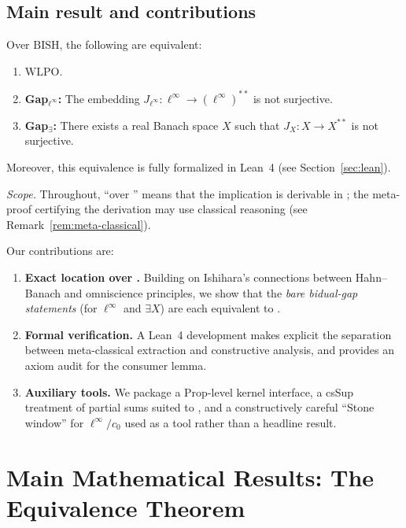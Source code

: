 \documentclass[11pt]{article}
\newcommand{\linf}{\ell^\infty}
\newcommand{\WLPO}{\mathrm{WLPO}}
\newcommand{\BISH}{\mathrm{BISH}}
\begin{document}
\subsection{Main result and contributions}

\begin{thm}
Over $\BISH$, the following are equivalent:
\begin{enumerate}
\item $\WLPO$.
\item \textbf{Gap$_{\linf}$:} The embedding $J_{\linf}:\linf\to(\linf)^{**}$ is not surjective.
\item \textbf{Gap$_{\exists}$:} There exists a real Banach space $X$ such that $J_X:X\to X^{**}$ is not surjective.
\end{enumerate}
Moreover, this equivalence is fully formalized in Lean~4 (see Section~\ref{sec:lean}).
\end{thm}

\noindent\emph{Scope.} Throughout, ``over \BISH'' means that the implication is derivable in \BISH; the meta-proof certifying the derivation may use classical reasoning (see Remark~\ref{rem:meta-classical}).

Our contributions are:
\begin{enumerate}[label=\arabic*.]
\item \textbf{Exact location over \BISH.} Building on Ishihara's connections between Hahn--Banach and omniscience principles, we show that the \emph{bare bidual-gap statements} (for $\ell^\infty$ and $\exists X$) are each equivalent to \WLPO.
\item \textbf{Formal verification.} A Lean~4 development makes explicit the separation between meta-classical extraction and constructive analysis, and provides an axiom audit for the consumer lemma.
\item \textbf{Auxiliary tools.} We package a Prop-level kernel interface, a csSup treatment of partial sums suited to \BISH, and a constructively careful ``Stone window'' for $\ell^\infty/c_0$ used as a tool rather than a headline result.
\end{enumerate}

\section{Main Mathematical Results: The Equivalence Theorem}
\end{document}
